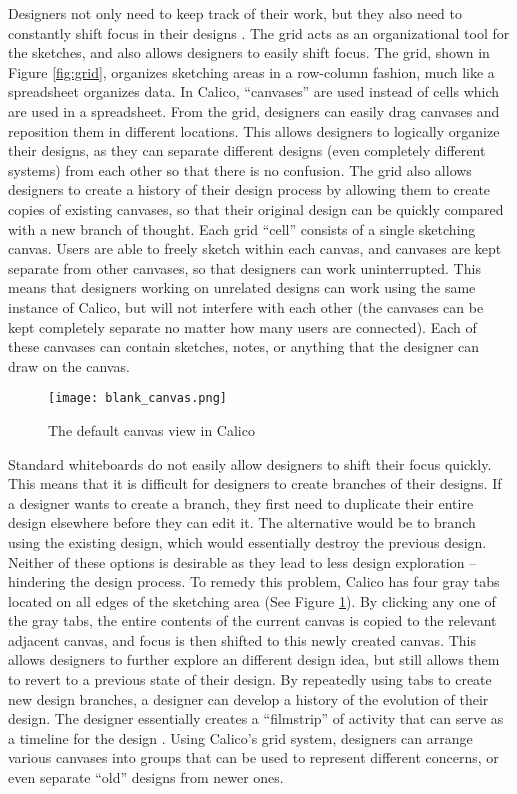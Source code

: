 Designers not only need to keep track of their work, but they also need to constantly shift focus in their designs \cite{petre, zannier}.
The grid acts as an organizational tool for the sketches, and also allows designers to easily shift focus.
The grid, shown in Figure \ref{fig:grid}, organizes sketching areas in a row-column fashion, much like a spreadsheet organizes data. 
In Calico, ``canvases'' are used instead of cells which are used in a spreadsheet.
From the grid, designers can easily drag canvases and reposition them in different locations. This allows designers to logically organize their designs, as they can separate different designs (even completely different systems) from each other so that there is no confusion. 
The grid also allows designers to create a history of their design process by allowing them to create copies of existing canvases, so that their original design can be quickly compared with a new branch of thought. Each grid ``cell'' consists of a single sketching canvas. 
Users are able to freely sketch within each canvas, and canvases are kept separate from other canvases, so that designers can work uninterrupted. This means that designers working on unrelated designs can work using the same instance of Calico, but will not interfere with each other (the canvases can be kept completely separate no matter how many users are connected).
Each of these canvases can contain sketches, notes, or anything that the designer can draw on the canvas. 


\begin{figure}[h]
  \centering
  \texttt{[image: blank\_canvas.png]}
  \caption{The default canvas view in Calico}
  \label{fig:canvas}
\end{figure}
Standard whiteboards do not easily allow designers to shift their focus quickly. This means that it is difficult for designers to create branches of their designs. If a designer wants to create a branch, they first need to duplicate their entire design elsewhere before they can edit it. The alternative would be to branch using the existing design, which would essentially destroy the previous design. Neither of these options is desirable as they lead to less design exploration -- hindering the design process. To remedy this problem, Calico has four gray tabs located on all edges of the sketching area (See Figure \ref{fig:canvas}). By clicking any one of the gray tabs, the entire contents of the current canvas is copied to the relevant adjacent canvas, and focus is then shifted to this newly created canvas. This allows designers to further explore an different design idea, but still allows them to revert to a previous state of their design. By repeatedly using tabs to create new design branches, a designer can develop a history of the evolution of their design. The designer essentially creates a ``filmstrip'' of activity that can serve as a timeline for the design \cite{filmstrip}. Using Calico's grid system, designers can arrange various canvases into groups that can be used to represent different concerns, or even separate ``old'' designs from newer ones.



